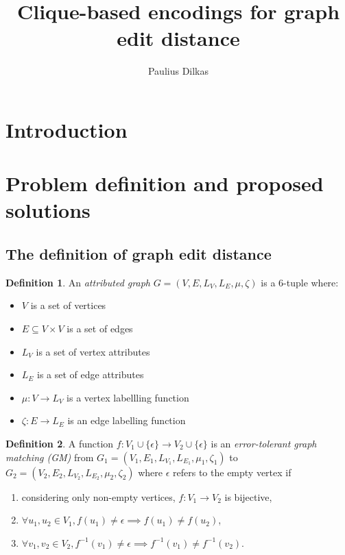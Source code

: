 \documentclass{article}
\author{Paulius Dilkas}
\title{Clique-based encodings for graph edit distance}
\theoremstyle{definition}
\newtheorem{definition}{Definition}[section]
\begin{document}
\maketitle
\section{Introduction}
\section{Problem definition and proposed solutions}
\subsection{The definition of graph edit distance}
\begin{definition}
  An \emph{attributed graph} $G = (V, E, L_V, L_E, \mu, \zeta)$ is a 6-tuple where:
  \begin{itemize}
  \item $V$ is a set of vertices
  \item $E \subseteq V \times V$ is a set of edges
  \item $L_V$ is a set of vertex attributes
  \item $L_E$ is a set of edge attributes
  \item $\mu : V \to L_V$ is a vertex labellling function
  \item $\zeta : E \to L_E$ is an edge labelling function
  \end{itemize}
\end{definition}
\begin{definition}
  A function $f: V_1 \cup \{ \epsilon \} \to V_2 \cup \{ \epsilon \}$ is an \emph{error-tolerant graph matching (GM)} from $G_1 = (V_1, E_1, L_{V_1}, L_{E_1}, \mu_1, \zeta_1)$ to $G_2 = (V_2, E_2, L_{V_2}, L_{E_2}, \mu_2, \zeta_2)$ where $\epsilon$ refers to the empty vertex if
  \begin{enumerate}
  \item considering only non-empty vertices, $f: V_1 \to V_2$ is bijective,
  \item $\forall u_1, u_2 \in V_1, f(u_1) \ne \epsilon \implies f(u_1) \ne f(u_2)$,
  \item $\forall v_1, v_2 \in V_2, f^{-1}(v_1) \ne \epsilon \implies f^{-1}(v_1) \ne f^{-1}(v_2)$.
  \end{enumerate}
\end{definition}
\end{document}
